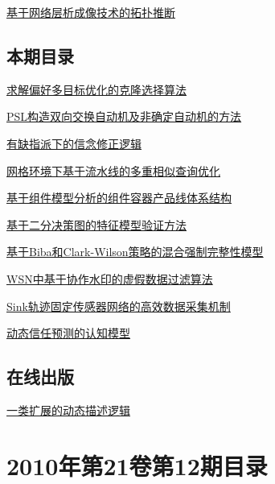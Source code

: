 \documentclass[a4paper]{article}
\begin{document}
\href{http://www.jos.org.cn/ch/reader/download_pdf.aspx?file_no=3692&year_id=2010&quarter_id=1&falg=1}{基于网络层析成像技术的拓扑推断}

\subsection{本期目录}
\href{http://www.jos.org.cn/ch/reader/download_pdf.aspx?file_no=3551&year_id=2010&quarter_id=1&falg=1}{求解偏好多目标优化的克隆选择算法}

\href{http://www.jos.org.cn/ch/reader/download_pdf.aspx?file_no=3456&year_id=2010&quarter_id=1&falg=1}{PSL构造双向交换自动机及非确定自动机的方法}

\href{http://www.jos.org.cn/ch/reader/download_pdf.aspx?file_no=3463&year_id=2010&quarter_id=1&falg=1}{有缺指派下的信念修正逻辑}

\href{http://www.jos.org.cn/ch/reader/download_pdf.aspx?file_no=3665&year_id=2010&quarter_id=1&falg=1}{网格环境下基于流水线的多重相似查询优化}

\href{http://www.jos.org.cn/ch/reader/download_pdf.aspx?file_no=3536&year_id=2010&quarter_id=1&falg=1}{基于组件模型分析的组件容器产品线体系结构}

\href{http://www.jos.org.cn/ch/reader/download_pdf.aspx?file_no=3525&year_id=2010&quarter_id=1&falg=1}{基于二分决策图的特征模型验证方法}

\href{http://www.jos.org.cn/ch/reader/download_pdf.aspx?file_no=3513&year_id=2010&quarter_id=1&falg=1}{基于Biba和Clark-Wilson策略的混合强制完整性模型}

\href{http://www.jos.org.cn/ch/reader/download_pdf.aspx?file_no=3373&year_id=2010&quarter_id=1&falg=1}{WSN中基于协作水印的虚假数据过滤算法}

\href{http://www.jos.org.cn/ch/reader/download_pdf.aspx?file_no=3688&year_id=2010&quarter_id=1&falg=1}{Sink轨迹固定传感器网络的高效数据采集机制}

\href{http://www.jos.org.cn/ch/reader/download_pdf.aspx?file_no=3558&year_id=2010&quarter_id=1&falg=1}{动态信任预测的认知模型}

\subsection{在线出版}
\href{http://www.jos.org.cn/ch/reader/download_pdf.aspx?file_no=3494&year_id=2010&quarter_id=1&falg=1}{一类扩展的动态描述逻辑}


\section{\textbf{2010年第21卷第12期目录}}
\end{document}
